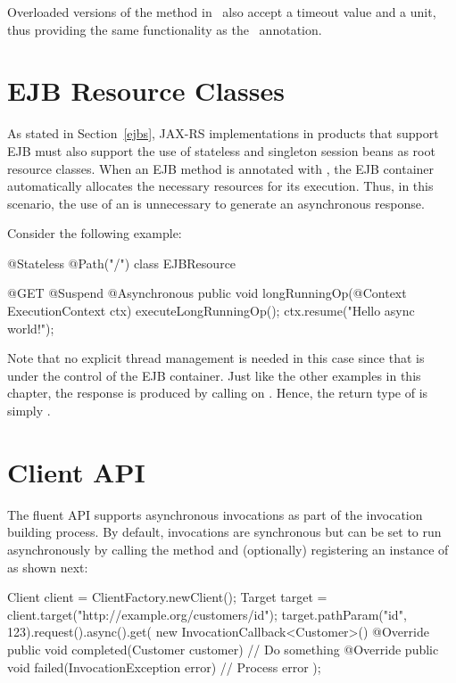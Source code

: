 Overloaded versions of the method  in \ExecutionContext\ also accept a timeout value and a unit, thus providing the same functionality as the \Suspend\ annotation. 

\section{EJB Resource Classes}
\label{async_ejbs}

As stated in Section~\ref{ejbs}, JAX-RS implementations in products that
support EJB must also support the use of stateless and singleton session beans
as root resource classes. When an EJB method is annotated with , the 
EJB container automatically allocates the necessary resources for its execution. 
Thus, in this scenario, the use of an  is unnecessary to generate
an asynchronous response.

Consider the following example:

\begin{listing}{1}
@Stateless 
@Path("/")
class EJBResource {

    @GET @Suspend @Asynchronous
    public void longRunningOp(@Context ExecutionContext ctx) {
        executeLongRunningOp();
        ctx.resume("Hello async world!");
    }
}
\end{listing}

Note that no explicit thread management is needed in this case since that is
under the control of the EJB container. Just like the other examples in this chapter,
the response is produced by calling  on . Hence,
the return type of  is simply .

\section{Client API}
\label{client_api_async}

The fluent API supports asynchronous invocations as part of the invocation building process. By default, invocations are synchronous but can be set to run asynchronously by calling the  method and (optionally) registering an instance of  as shown next:

\begin{listing}{1}
Client client = ClientFactory.newClient();
Target target = client.target("http://example.org/customers/{id}");
target.pathParam("id", 123).request().async().get(
    new InvocationCallback<Customer>() {
        @Override
        public void completed(Customer customer) {
            // Do something
        }
        @Override
        public void failed(InvocationException error) {
            // Process error
        }
    });
\end{listing}

